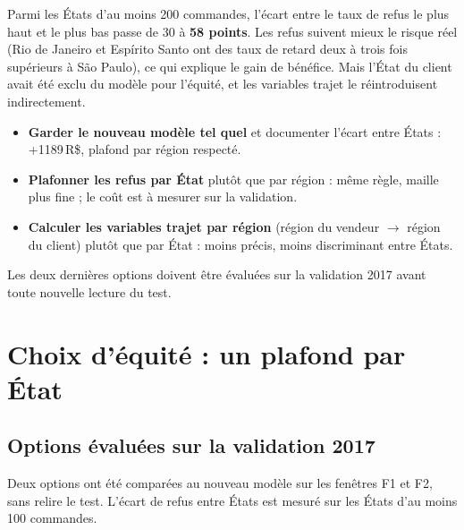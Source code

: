 \documentclass[11pt,a4paper]{article}
\newcommand{\RS}{\,R\$}
\begin{document}
Parmi les États d'au moins 200 commandes, l'écart entre le taux de refus le plus haut et le
plus bas passe de 30 à \textbf{58 points}. Les refus suivent mieux le risque réel (Rio de
Janeiro et Espírito Santo ont des taux de retard deux à trois fois supérieurs à São Paulo),
ce qui explique le gain de bénéfice. Mais l'État du client avait été exclu du modèle pour
l'équité, et les variables trajet le réintroduisent indirectement.

\begin{encadre}[colframe=prudence, title=Décision à prendre par l'équipe]
\begin{itemize}[leftmargin=12pt]
  \item \textbf{Garder le nouveau modèle tel quel} et documenter l'écart entre États :
        +\num{1189}\RS{}, plafond par région respecté.
  \item \textbf{Plafonner les refus par État} plutôt que par région : même règle, maille plus
        fine ; le coût est à mesurer sur la validation.
  \item \textbf{Calculer les variables trajet par région} (région du vendeur $\rightarrow$ région
        du client) plutôt que par État : moins précis, moins discriminant entre États.
\end{itemize}
Les deux dernières options doivent être évaluées sur la validation 2017 avant toute nouvelle
lecture du test.
\end{encadre}

\section{Choix d'équité : un plafond par État}

\subsection{Options évaluées sur la validation 2017}

Deux options ont été comparées au nouveau modèle sur les fenêtres F1 et F2, sans relire le test.
L'écart de refus entre États est mesuré sur les États d'au moins 100 commandes.
\end{document}
